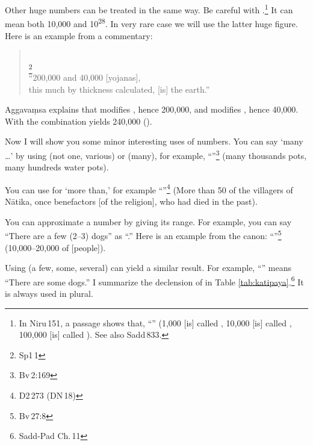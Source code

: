Other huge numbers can be treated in the same way. Be careful with .\footnote{In Niru\,151, a passage shows that, ``'' (1,000 [is] called , 10,000 [is] called , 100,000 [is] called ). See also Sadd\,833.} It can mean both 10,000 and 10\textsuperscript{28}. In very rare case we will use the latter huge figure. Here is an example from a commentary:

\begin{quote}
 \\
\footnote{Sp1\,1} \\[1.5mm]
``200,000 and 40,000 [yojanas], \\
this much by thickness calculated, [is] the earth.''
\end{quote}

Aggava\d msa explains that  modifies , hence 200,000, and  modifies , hence 40,000. With  the combination yields 240,000 ().

Now I will show you some minor interesting uses of numbers. You can say `many \ldots' by using  (not one, various) or  (many), for example, ``''\footnote{Bv\,2:169} (many thousands pots, many hundreds water pots).

You can use  for `more than,' for example ``''\footnote{D2\,273 (DN\,18)} (More than 50 of the villagers of N\=atika, once benefactors [of the religion], who had died in the past).

You can approximate a number by giving its range. For example, you can say ``There are a few (2--3) dogs'' as ``.'' Here is an example from the canon: ``''\footnote{Bv\,27:8} (10,000--20,000 of [people]).

Using  (a few, some, several) can yield a similar result. For example, ``'' means ``There are some dogs.'' I summarize the declension of  in Table \ref{tab:katipaya}.\footnote{Sadd-Pad Ch.\,11} It is always used in plural.

